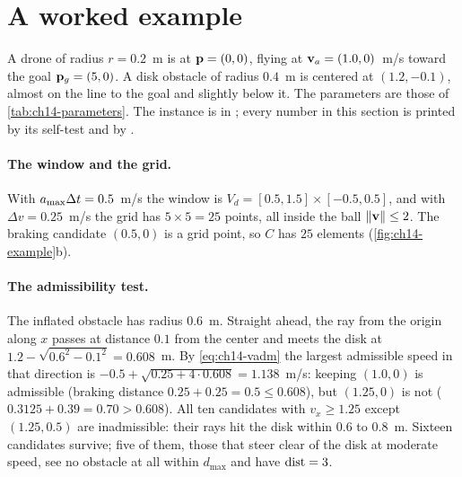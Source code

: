 \section{A worked example}
\label{sec:ch14-example}

\begin{example}
\label{ex:ch14-approach}
A drone of radius $r = 0.2$~m is at $\mathbf{p} = (0, 0)$, flying at
$\mathbf{v}_a = (1.0, 0)$~m/s toward the goal $\mathbf{p}_g = (5, 0)$. A disk obstacle
of radius $0.4$~m is centered at $(1.2, -0.1)$, almost on the line to the
goal and slightly below it. The parameters are those of
\cref{tab:ch14-parameters}. The instance is  in
; every number in this section is printed by its self-test
and by .
\end{example}

\paragraph{The window and the grid.}
With $a_{\max}\Delta t = 0.5$~m/s the window is
$V_d = [0.5, 1.5] \times [-0.5, 0.5]$, and with $\Delta v = 0.25$~m/s the
grid has $5 \times 5 = 25$ points, all inside the ball $\left\lVert \mathbf{v} \right\rVert \le 2$.
The braking candidate $(0.5, 0)$ is a grid point, so $C$ has $25$
elements (\cref{fig:ch14-example}b).

\paragraph{The admissibility test.}
The inflated obstacle has radius $0.6$~m. Straight ahead, the ray from the
origin along $x$ passes at distance $0.1$ from the center and meets the disk
at $1.2 - \sqrt{0.6^2 - 0.1^2} = 0.608$~m. By \cref{eq:ch14-vadm} the
largest admissible speed in that direction is
$-0.5 + \sqrt{0.25 + 4 \cdot 0.608} = 1.138$~m/s: keeping $(1.0, 0)$ is
admissible (braking distance $0.25 + 0.25 = 0.5 \le 0.608$), but
$(1.25, 0)$ is not ($0.3125 + 0.39 = 0.70 > 0.608$). All ten candidates with
$v_x \ge 1.25$ except $(1.25, 0.5)$ are inadmissible: their rays hit the
disk within $0.6$ to $0.8$~m. Sixteen candidates survive; five of them, those
that steer clear of the disk at moderate speed, see no obstacle at all
within $d_{\max}$ and have $\operatorname{dist} = 3$.

